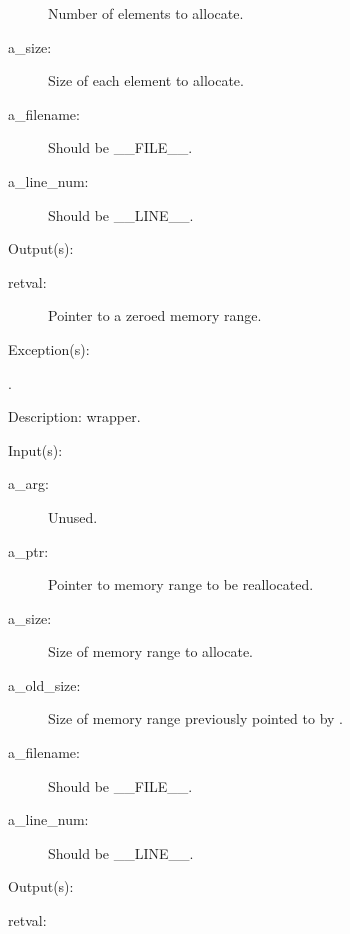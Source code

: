 \begin{capi}
\begin{capilist}
\begin{description}
			Number of elements to allocate.
		\item[a\_size: ]
			Size of each element to allocate.
		\item[a\_filename: ]
			Should be \_\_FILE\_\_.
		\item[a\_line\_num: ]
			Should be \_\_LINE\_\_.
		\end{description}
	\item[Output(s): ]
		\begin{description}\item[]
		\item[retval: ]
			Pointer to a zeroed memory range.
		\end{description}
	\item[Exception(s): ]
		\begin{description}\item[]
		\item[.]
		\end{description}
	\item[Description: ]
		 wrapper.
	\end{capilist}
\label{nxa_realloc_e}
\label{nxa_realloc}
	\begin{capilist}
	\item[Input(s): ]
		\begin{description}\item[]
		\item[a\_arg: ]
			Unused.
		\item[a\_ptr: ]
			Pointer to memory range to be reallocated.
		\item[a\_size: ]
			Size of memory range to allocate.
		\item[a\_old\_size: ]
			Size of memory range previously pointed to by
			.
		\item[a\_filename: ]
			Should be \_\_FILE\_\_.
		\item[a\_line\_num: ]
			Should be \_\_LINE\_\_.
		\end{description}
	\item[Output(s): ]
		\begin{description}\item[]
		\item[retval: ]

\end{description}
\end{capilist}
\end{capi}
